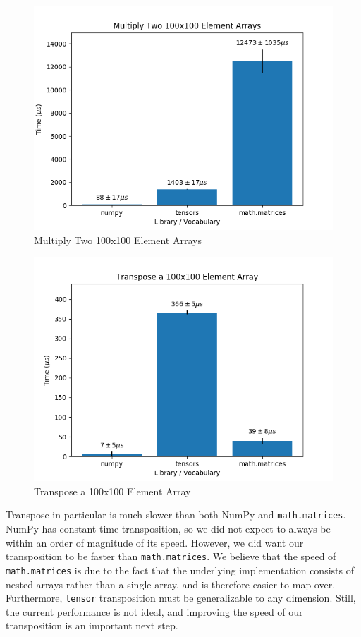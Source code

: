 \documentclass[
]{article}
\begin{document}
\begin{figure}
\centering
\includegraphics{matmul.png}
\caption{Multiply Two 100x100 Element Arrays}
\end{figure}

\begin{figure}
\centering
\includegraphics{transpose.png}
\caption{Transpose a 100x100 Element Array}
\end{figure}

Transpose in particular is much slower than both NumPy and
\texttt{math.matrices}. NumPy has constant-time transposition, so we did
not expect to always be within an order of magnitude of its speed.
However, we did want our transposition to be faster than
\texttt{math.matrices}. We believe that the speed of
\texttt{math.matrices} is due to the fact that the underlying
implementation consists of nested arrays rather than a single array, and
is therefore easier to map over. Furthermore, \texttt{tensor}
transposition must be generalizable to any dimension. Still, the current
performance is not ideal, and improving the speed of our transposition
is an important next step.
\end{document}

